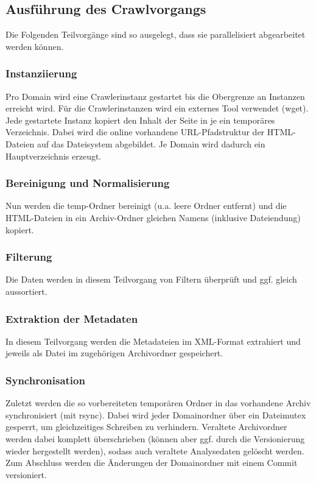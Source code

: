 \subsection{Ausführung des Crawlvorgangs}
	Die Folgenden Teilvorgänge sind so ausgelegt, dass sie parallelisiert abgearbeitet werden können.
	\subsubsection{Instanziierung} \label{spec:req:crawler:instance}
		Pro Domain wird eine Crawlerinstanz gestartet bis die Obergrenze an Instanzen erreicht wird.
		Für die Crawlerinstanzen wird ein externes Tool verwendet (wget).
		Jede gestartete Instanz kopiert den Inhalt der Seite in je ein temporäres Verzeichnis.
		Dabei wird die online vorhandene URL-Pfadstruktur der HTML-Dateien auf das Dateisystem abgebildet.
		Je Domain wird dadurch ein Hauptverzeichnis erzeugt.
	\subsubsection{Bereinigung und Normalisierung} \label{spec:req:crawler:normalize}
		Nun werden die temp-Ordner bereinigt (u.a. leere Ordner entfernt)
		und die HTML-Dateien in ein Archiv-Ordner gleichen Namens (inklusive Dateiendung) kopiert.
	\subsubsection{Filterung} \label{spec:req:crawler:filter}
		Die Daten werden in diesem Teilvorgang von Filtern überprüft und ggf. gleich aussortiert.
	\subsubsection{Extraktion der Metadaten}\label{spec:req:crawler:extraction}
		In diesem Teilvorgang werden die Metadateien im XML-Format extrahiert und jeweils als Datei im zugehörigen Archivordner gespeichert.
	\subsubsection{Synchronisation}\label{spec:req:crawler:sync}
		Zuletzt werden die so vorbereiteten temporären Ordner in das vorhandene Archiv synchronisiert (mit rsync). 
		Dabei wird jeder Domainordner über ein Dateimutex gesperrt, um gleichzeitiges Schreiben zu verhindern. 
		Veraltete Archivordner werden dabei komplett überschrieben (können aber ggf. durch die Versionierung wieder hergestellt werden),
		sodass auch veraltete Analysedaten gelöscht werden.\\
		Zum Abschluss werden die Änderungen der Domainordner mit einem Commit versioniert.

